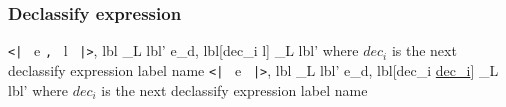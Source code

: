 \subsubsection{Declassify expression}

      {\langle \texttt{<|} \, e \texttt{,} \, l \, \texttt{|>}, lbl \rangle \rightarrow_L lbl'}
      {\langle e_d, lbl[dec_i \mapsto l] \rangle \rightarrow_L lbl'}
      {where $dec_i$ is the next declassify expression label name}
      {\langle \texttt{<|} \, e \, \texttt{|>}, lbl \rangle \rightarrow_L lbl'}
      {\langle e_d, lbl[dec_i \mapsto \underline{dec_i}] \rangle \rightarrow_L lbl'}
      {where $dec_i$ is the next declassify expression label name}


